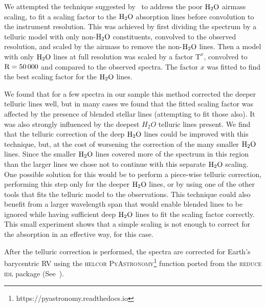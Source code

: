 \documentclass[fleqn,usenatbib]{mnras}
\begin{document}
We attempted the technique suggested by~\citet{bertaux_tapas_2014} to address the poor \(\rm H_{2}O\) airmass scaling, to fit a scaling factor to the \(\rm {H}_{2}O\) absorption lines before convolution to the instrument resolution. This was achieved by first dividing the spectrum by a telluric model with only non-\(\rm H_{2}O\) constituents, convolved to the observed resolution, and scaled by the airmass to remove the non-\(\rm H_{2}O\) lines. Then a model with only \(\rm H_{2}O\) lines at full resolution was scaled by a factor \(\textrm{T}^{x}\), convolved to \(\rm R=50\,000\) and compared to the observed spectra. The factor \(x\) was fitted to find the best scaling factor for the \(\rm H_{2}O\) lines.

We found that for a few spectra in our sample this method corrected the deeper telluric lines well, but in many cases we found that the fitted scaling factor was affected by the presence of blended stellar lines (attempting to fit those also). It was also strongly influenced by the deepest \(H_{2}O\) telluric lines present. We find that the telluric correction of the deep \(\rm H_{2}O\) lines could be improved with this technique, but, at the cost of worsening the correction of the many smaller \(\rm H_{2}O\) lines. Since the smaller \(\rm H_{2}O\) lines covered more of the spectrum in this region than the larger lines we chose not to continue with this separate \(\rm H_{2}O\) scaling. One possible solution for this would be to perform a piece-wise telluric correction, performing this step only for the deeper \( \rm H_{2}O\) lines, or by using one of the other tools that fits the telluric model to the observations. This technique could also benefit from a larger wavelength span that would enable blended lines to be ignored while having sufficient deep \(\rm H_{2}O\) lines to fit the scaling factor correctly. This small experiment shows that a simple scaling is not enough to correct for the absorption in an effective way, for this case.

After the telluric correction is performed, the spectra are corrected for Earth's barycentric RV using the \textsc{helcor} \textsc{PyAstronomy}\footnote{https://pyastronomy.readthedocs.io} function ported from the \textsc{reduce idl} package (See~\citet[][]{piskunov_new_2002}).
\end{document}
